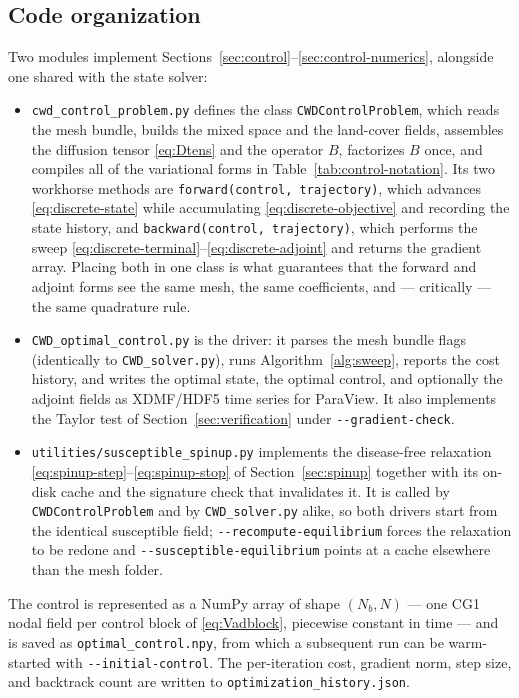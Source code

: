 \documentclass[11pt]{article}
\begin{document}
\subsection{Code organization}

Two modules implement Sections~\ref{sec:control}--\ref{sec:control-numerics}, alongside one shared with the state solver:

\begin{itemize}
\item \texttt{cwd\_control\_problem.py} defines the class \texttt{CWDControlProblem}, which reads the mesh bundle, builds the mixed space and the land-cover fields, assembles the diffusion tensor \eqref{eq:Dtens} and the operator $B$, factorizes $B$ once, and compiles all of the variational forms in Table~\ref{tab:control-notation}. Its two workhorse methods are \texttt{forward(control, trajectory)}, which advances \eqref{eq:discrete-state} while accumulating \eqref{eq:discrete-objective} and recording the state history, and \texttt{backward(control, trajectory)}, which performs the sweep \eqref{eq:discrete-terminal}--\eqref{eq:discrete-adjoint} and returns the gradient array. Placing both in one class is what guarantees that the forward and adjoint forms see the same mesh, the same coefficients, and --- critically --- the same quadrature rule.

\item \texttt{CWD\_optimal\_control.py} is the driver: it parses the mesh bundle flags (identically to \texttt{CWD\_solver.py}), runs Algorithm~\ref{alg:sweep}, reports the cost history, and writes the optimal state, the optimal control, and optionally the adjoint fields as XDMF/HDF5 time series for ParaView. It also implements the Taylor test of Section~\ref{sec:verification} under \texttt{-{}-gradient-check}.

\item \texttt{utilities/susceptible\_spinup.py} implements the disease-free relaxation \eqref{eq:spinup-step}--\eqref{eq:spinup-stop} of Section~\ref{sec:spinup} together with its on-disk cache and the signature check that invalidates it. It is called by \texttt{CWDControlProblem} and by \texttt{CWD\_solver.py} alike, so both drivers start from the identical susceptible field; \texttt{-{}-recompute-equilibrium} forces the relaxation to be redone and \texttt{-{}-susceptible-equilibrium} points at a cache elsewhere than the mesh folder.
\end{itemize}

The control is represented as a NumPy array of shape $(N_b, N)$ --- one CG1 nodal field per control block of \eqref{eq:Vadblock}, piecewise constant in time --- and is saved as \texttt{optimal\_control.npy}, from which a subsequent run can be warm-started with \texttt{-{}-initial-control}. The per-iteration cost, gradient norm, step size, and backtrack count are written to \texttt{optimization\_history.json}.
\end{document}
